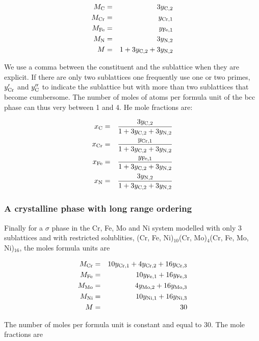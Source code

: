 \documentclass[12pt]{article}
\begin{document}
\begin{eqnarray*}
M_{\rm C} &=& 3y_{\rm C,2}\\
M_{\rm Cr} &=& y_{\rm Cr,1}\\
M_{\rm Fe} &=& y_{\rm Fe,1}\\
M_{\rm N} &=& 3y_{\rm N,2}\\
M &=& 1+3y_{\rm C,2}+3y_{\rm N,2}
\end{eqnarray*}

We use a comma between the constituent and the sublattice when they
are explicit.  If there are only two sublattices one frequently use
one or two primes, $y'_{\rm Cr}$ and $y''_{\rm C}$ to indicate the
sublattice but with more than two sublattices that become cumbersome.
The number of moles of atoms per formula unit of the bcc phase can
thus very between 1 and 4.  He mole fractions are:

\begin{eqnarray*}
x_{\rm C} &=& \frac{3y_{\rm C,2}}{1+3y_{\rm C,2}+3y_{\rm N,2}}\\
x_{\rm Cr} &=& \frac{y_{\rm Cr,1}}{1+3y_{\rm C,2}+3y_{\rm N,2}}\\
x_{\rm Fe} &=& \frac{y_{\rm Fe,1}}{1+3y_{\rm C,2}+3y_{\rm N,2}}\\
x_{\rm N} &=& \frac{3y_{\rm N,2}}{1+3y_{\rm C,2}+3y_{\rm N,2}}\\
\end{eqnarray*}

\subsubsection{A crystalline phase with long range ordering}

Finally for a $\sigma$ phase in the Cr, Fe, Mo and Ni system modelled
with only 3 sublattices and with restricted solublities, (Cr, Fe,
Ni)$_{10}$(Cr, Mo)$_4$(Cr, Fe, Mo, Ni)$_{16}$, the moles formula units
are

\begin{eqnarray*}
M_{\rm Cr} &=& 10y_{\rm Cr,1} + 4y_{\rm Cr,2} + 16y_{\rm Cr,3}\\
M_{\rm Fe} &=& 10y_{\rm Fe,1}+16y_{\rm Fe,3}\\
M_{\rm Mo} &=& 4y_{\rm Mo,2}+16y_{\rm Mo,3}\\
M_{\rm Ni} &=& 10y_{\rm Ni,1}+16y_{\rm Ni,3}\\
M &=& 30
\end{eqnarray*}

The number of moles per formula unit is constant and equal to 30.  The
mole fractions are
\end{document}
